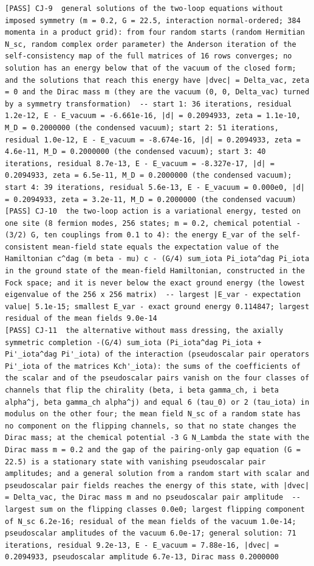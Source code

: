 \documentclass[
  10pt,
]{article}
\begin{document}
\begin{verbatim}
[PASS] CJ-9  general solutions of the two-loop equations without imposed symmetry (m = 0.2, G = 22.5, interaction normal-ordered; 384 momenta in a product grid): from four random starts (random Hermitian N_sc, random complex order parameter) the Anderson iteration of the self-consistency map of the full matrices of 16 rows converges; no solution has an energy below that of the vacuum of the closed form; and the solutions that reach this energy have |dvec| = Delta_vac, zeta = 0 and the Dirac mass m (they are the vacuum (0, 0, Delta_vac) turned by a symmetry transformation)  -- start 1: 36 iterations, residual 1.2e-12, E - E_vacuum = -6.661e-16, |d| = 0.2094933, zeta = 1.1e-10, M_D = 0.2000000 (the condensed vacuum); start 2: 51 iterations, residual 1.0e-12, E - E_vacuum = -8.674e-16, |d| = 0.2094933, zeta = 4.6e-11, M_D = 0.2000000 (the condensed vacuum); start 3: 40 iterations, residual 8.7e-13, E - E_vacuum = -8.327e-17, |d| = 0.2094933, zeta = 6.5e-11, M_D = 0.2000000 (the condensed vacuum); start 4: 39 iterations, residual 5.6e-13, E - E_vacuum = 0.000e0, |d| = 0.2094933, zeta = 3.2e-11, M_D = 0.2000000 (the condensed vacuum)
[PASS] CJ-10  the two-loop action is a variational energy, tested on one site (8 fermion modes, 256 states; m = 0.2, chemical potential -(3/2) G, ten couplings from 0.1 to 4): the energy E_var of the self-consistent mean-field state equals the expectation value of the Hamiltonian c^dag (m beta - mu) c - (G/4) sum_iota Pi_iota^dag Pi_iota in the ground state of the mean-field Hamiltonian, constructed in the Fock space; and it is never below the exact ground energy (the lowest eigenvalue of the 256 x 256 matrix)  -- largest |E_var - expectation value| 5.1e-15; smallest E_var - exact ground energy 0.114847; largest residual of the mean fields 9.0e-14
[PASS] CJ-11  the alternative without mass dressing, the axially symmetric completion -(G/4) sum_iota (Pi_iota^dag Pi_iota + Pi'_iota^dag Pi'_iota) of the interaction (pseudoscalar pair operators Pi'_iota of the matrices Kch'_iota): the sums of the coefficients of the scalar and of the pseudoscalar pairs vanish on the four classes of channels that flip the chirality (beta, i beta gamma_ch, i beta alpha^j, beta gamma_ch alpha^j) and equal 6 (tau_0) or 2 (tau_iota) in modulus on the other four; the mean field N_sc of a random state has no component on the flipping channels, so that no state changes the Dirac mass; at the chemical potential -3 G N_Lambda the state with the Dirac mass m = 0.2 and the gap of the pairing-only gap equation (G = 22.5) is a stationary state with vanishing pseudoscalar pair amplitudes; and a general solution from a random start with scalar and pseudoscalar pair fields reaches the energy of this state, with |dvec| = Delta_vac, the Dirac mass m and no pseudoscalar pair amplitude  -- largest sum on the flipping classes 0.0e0; largest flipping component of N_sc 6.2e-16; residual of the mean fields of the vacuum 1.0e-14; pseudoscalar amplitudes of the vacuum 6.0e-17; general solution: 71 iterations, residual 9.2e-13, E - E_vacuum = 7.88e-16, |dvec| = 0.2094933, pseudoscalar amplitude 6.7e-13, Dirac mass 0.2000000

\end{verbatim}
\end{document}
